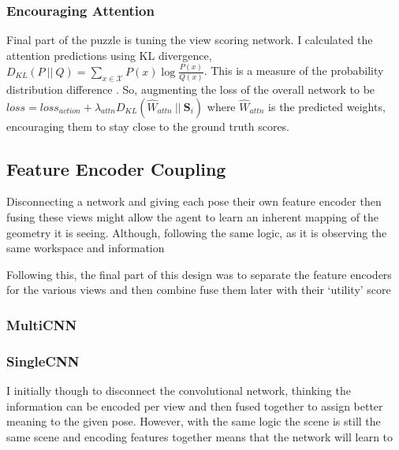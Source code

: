 \subsubsection{Encouraging Attention}
Final part of the puzzle is tuning the view scoring network. I calculated the attention predictions using KL divergence, \(D_{KL}\left(P ~||~ Q\right) = \sum_{x \in \mathcal{X}} P\left(x\right) \log \frac{P\left(x\right)}{Q\left(x\right)}\). This is a measure of the probability distribution difference . So, augmenting the loss of the overall network to be \(loss = loss_{action} + \lambda_{attn} D_{KL}\left( \hat{W}_{attn} ~||~ \mathbf{S}_i\right)\) where $\hat{W}_{attn}$ is the predicted weights, encouraging them to stay close to the ground truth scores.

\subsection{Feature Encoder Coupling}
Disconnecting a network  and giving each pose their own feature encoder then fusing these views might allow the agent to learn an inherent mapping of the geometry it is seeing. Although, following the same logic, as it is observing the same workspace and information

Following this, the final part of this design was to separate the feature encoders for the various views and then combine fuse them later with their `utility' score



\subsubsection{MultiCNN}
\subsubsection{SingleCNN}
I initially though to disconnect the convolutional network, thinking the information can be encoded per view and then fused together to assign better meaning to the given pose. However, with the same logic the scene is still the same scene and encoding features together means that the network will learn to 